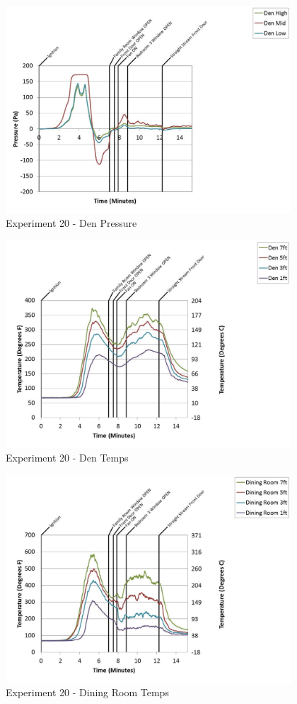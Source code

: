 \documentclass{article}
\begin{document}
\begin{appendices}
	\begin{figure}[h!]
		\centering
		\includegraphics[height=3.05in]{0_Images/Results_Charts/Exp_20_Charts/DenPressure.pdf}
		\caption{Experiment 20 - Den Pressure}
	\end{figure}
 
	\clearpage

	\begin{figure}[h!]
		\centering
		\includegraphics[height=3.05in]{0_Images/Results_Charts/Exp_20_Charts/DenTemps.pdf}
		\caption{Experiment 20 - Den Temps}
	\end{figure}
 

	\begin{figure}[h!]
		\centering
		\includegraphics[height=3.05in]{0_Images/Results_Charts/Exp_20_Charts/DiningRoomTemps.pdf}
		\caption{Experiment 20 - Dining Room Temps}
	\end{figure}
 

\end{appendices}
\end{document}
